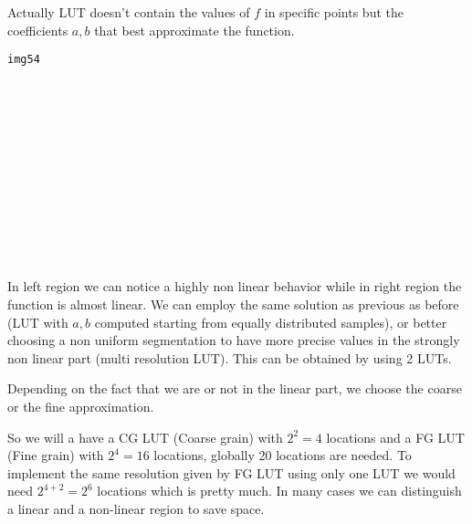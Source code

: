Actually LUT doesn't contain the values of $f$ in specific points but the coefficients $a,b$ that best approximate the function.

\begin{verbatim}
img54














\end{verbatim}

In left region we can notice a highly non linear behavior while in right region the function is almost linear. We can employ the same solution as previous as before (LUT with $a,b$ computed starting from equally distributed samples), or better choosing a non uniform segmentation to have more precise values in the strongly non linear part (multi resolution LUT). This can be obtained by using 2 LUTs.

Depending on the fact that we are or not in the linear part, we choose the coarse or the fine approximation.

So we will a have a CG LUT (Coarse grain) with $2^2=4$ locations and a FG LUT (Fine grain) with $2^4=16$ locations, globally 20 locations are needed.
To implement the same resolution given by FG LUT using only one LUT we would need $2^{4+2}=2^6$ locations which is pretty much. In many cases we can distinguish a linear and a non-linear region to save space.
